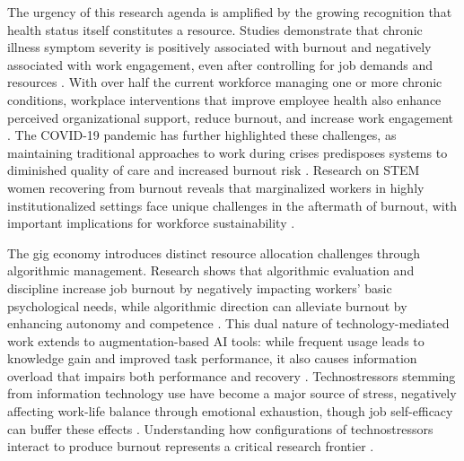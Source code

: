 The urgency of this research agenda is amplified by the growing recognition that health status itself constitutes a resource. Studies demonstrate that chronic illness symptom severity is positively associated with burnout and negatively associated with work engagement, even after controlling for job demands and resources \citep{cook_individual_2024}. With over half the current workforce managing one or more chronic conditions, workplace interventions that improve employee health also enhance perceived organizational support, reduce burnout, and increase work engagement \citep{haynes_evaluating_2021}. The COVID-19 pandemic has further highlighted these challenges, as maintaining traditional approaches to work during crises predisposes systems to diminished quality of care and increased burnout risk \citep{yoo_critical_2022}. Research on STEM women recovering from burnout reveals that marginalized workers in highly institutionalized settings face unique challenges in the aftermath of burnout, with important implications for workforce sustainability \citep{lee_beyond_2024}.

The gig economy introduces distinct resource allocation challenges through algorithmic management. Research shows that algorithmic evaluation and discipline increase job burnout by negatively impacting workers' basic psychological needs, while algorithmic direction can alleviate burnout by enhancing autonomy and competence \citep{peng_every_2025}. This dual nature of technology-mediated work extends to augmentation-based AI tools: while frequent usage leads to knowledge gain and improved task performance, it also causes information overload that impairs both performance and recovery \citep{shao_using_2024}. Technostressors stemming from information technology use have become a major source of stress, negatively affecting work-life balance through emotional exhaustion, though job self-efficacy can buffer these effects \citep{ma_impact_2021}. Understanding how configurations of technostressors interact to produce burnout represents a critical research frontier \citep{pflügner_deconstructing_2024}.

